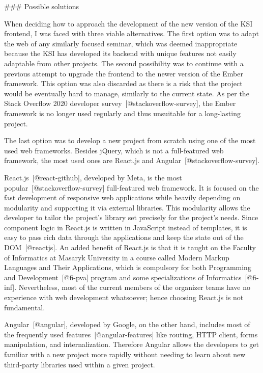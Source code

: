 \documentclass[
  digital, %
  oneside, %
  lof,     %
  nolot,     %
]{fithesis4}
\begin{document}
### Possible solutions

When deciding how to approach the development of the new version of the \acrshort{KSI} frontend, I was faced with three viable alternatives. The first option was to adapt the web of any similarly focused seminar, which was deemed inappropriate because the \acrshort{KSI} has developed its backend with unique features not easily adaptable from other projects. The second possibility was to continue with a previous attempt to upgrade the frontend to the newer version of the Ember framework. This option was also discarded as there is a risk that the project would be eventually hard to manage, similarly to the current state. As per the Stack Overflow 2020 developer survey~[@stackoverflow-survey], the Ember framework is no longer used regularly and thus unsuitable for a long-lasting project.

The last option was to develop a new project from scratch using one of the most used web frameworks. Besides jQuery, which is not a full-featured web framework, the most used ones are React.js and Angular~[@stackoverflow-survey].

React.js~[@react-github], developed by Meta, is the most popular~[@stackoverflow-survey] full-featured web framework. It is focused on the fast development of responsive web applications while heavily depending on modularity and supporting it via external libraries. This modularity allows the developer to tailor the project's library set precisely for the project's needs. Since component logic in React.js is written in JavaScript instead of templates, it is easy to pass rich data through the applications and keep the state out of the \acrshort{DOM}~[@reactjs]. An added benefit of React.js is that it is taught on the Faculty of Informatics at Masaryk University in a course called Modern Markup Languages and Their Applications, which is compulsory for both
Programming and Development~[@fi-pva] program and some specializations of Informatics~[@fi-inf]. Nevertheless, most of the current members of the organizer teams have no experience with web development whatsoever; hence choosing React.js is not fundamental.

Angular~[@angular], developed by Google, on the other hand, includes most of the frequently used features~[@angular-features] like routing, \acrshort{HTTP} client, forms manipulation, and internalization. Therefore Angular allows the developers to get familiar with a new project more rapidly without needing to learn about new third-party libraries used within a given project.
\end{document}
